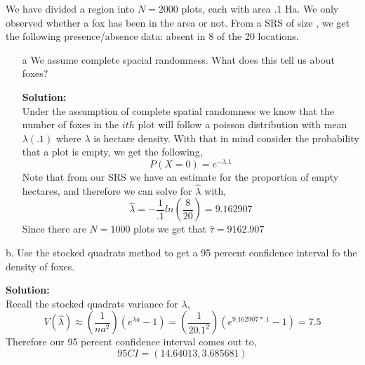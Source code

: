 \documentclass[12pt]{article}
\makeatletter
\theoremstyle{homework}
\newenvironment{exercise}[1]
{\def\@currentlabel{#1}\exercisecore}
{\endexercisecore}
\newcommand{\localhead}[1]{\par\smallskip\noindent\textbf{#1}\nobreak\\}%
\newcommand\solution{\localhead{Solution:}}
\makeatother
\begin{document}
\vspace{1in}




\begin{exercise}{3} We have divided a region into $N = 2000$ plots, each with area $.1$ Ha. 
  We only observed whether a fox has been in the area or not. From a SRS of size , we get the following 
  presence/absence data: absent in 8 of the 20 locations.\\
  \begin{enumerate}
    \item[a] We assume complete spacial randomness. What does this tell us about foxes?\\
    \solution Under the assumption of complete spatial randomness we know that the number of foxes in the $ith$ plot 
    will follow a poisson distribution with mean $\lambda(.1)$ where $\lambda$ is hectare density. With that in mind consider the probability 
    that a plot is empty, we get the following, 
    \begin{equation*}
      P(X = 0) = e^{-\lambda .1}
    \end{equation*}
    Note that from our SRS we have an estimate for the proportion of empty hectares, and therefore we can solve for $\hat{\lambda}$ with, 
    \begin{equation*}
      \hat{\lambda} = -\frac{1}{.1}ln(\frac{8}{20}) = 9.162907
    \end{equation*}
    Since there are $N = 1000$ plots we get that $\hat{\tau} = 9162.907$
  \end{enumerate}
  \vspace{.15in}

  \item[b.] Use the stocked quadrats method to get a 95 percent confidence interval fo the density of foxes.\\
  \solution Recall the stocked quadrats variance for $\lambda$, 
  \begin{equation*}
    V(\hat{\lambda})\approx \left(\dfrac{1}{na^2}\right)(e^{\lambda a} - 1) = \left(\dfrac{1}{20 .1^2}\right)(e^{9.162907 *.1} - 1)  = 7.5
  \end{equation*} 
  Therefore our 95 percent confidence interval comes out to, 
  \begin{equation*}
    95CI = \left(14.64013, 3.685681 \right)
  \end{equation*}
\end{exercise}

\vspace{1in}
\end{document}
